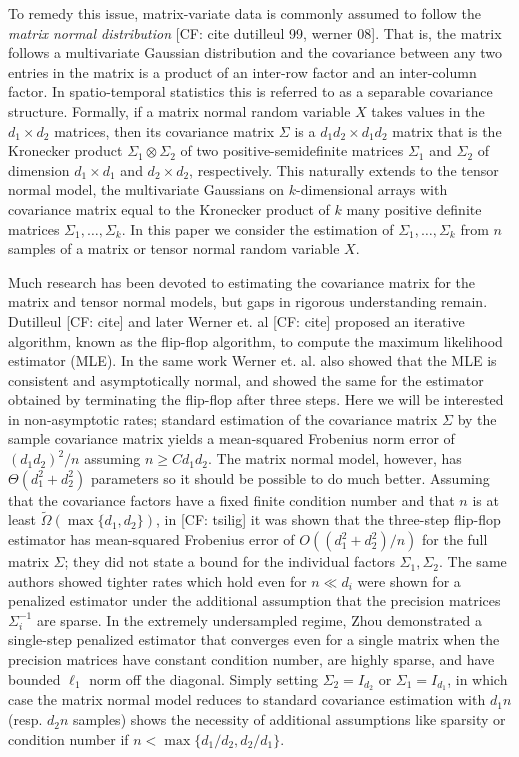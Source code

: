 \documentclass{article}
\newcommand{\ot}{\otimes}
\newcommand{\CF}[1]{{\color{purple}[CF: #1]}}
\begin{document}
To remedy this issue, matrix-variate data is commonly assumed to follow the \emph{matrix normal distribution} \CF{cite dutilleul 99, werner 08}. That is, the matrix follows a multivariate Gaussian distribution and the covariance between any two entries in the matrix is a product of an inter-row factor and an inter-column factor. In spatio-temporal statistics this is referred to as a separable covariance structure. Formally, if a matrix normal random variable $X$ takes values in the $d_1\times d_2$ matrices, then its covariance matrix $\Sigma$ is a $d_1d_2\times d_1 d_2$ matrix that is the Kronecker product $\Sigma_1 \ot \Sigma_2$ of two positive-semidefinite matrices $\Sigma_1$ and $\Sigma_2$ of dimension $d_1\times d_1$ and $d_2\times d_2$, respectively. This naturally extends to the tensor normal model, the multivariate Gaussians on $k$-dimensional arrays with covariance matrix equal to the Kronecker product of $k$ many positive definite matrices $\Sigma_1, \dots, \Sigma_k$. In this paper we consider the estimation of $\Sigma_1, \dots, \Sigma_k$ from $n$ samples of a matrix or tensor normal random variable $X$. 

Much research has been devoted to estimating the covariance matrix for the matrix and tensor normal models, but gaps in rigorous understanding remain. Dutilleul \CF{cite} and later Werner et. al \CF{cite} proposed an iterative algorithm, known as the flip-flop algorithm, to compute the maximum likelihood estimator (MLE). In the same work Werner et. al. also showed that the MLE is consistent and asymptotically normal, and showed the same for the estimator obtained by terminating the flip-flop after three steps. Here we will be interested in non-asymptotic rates; standard estimation of the covariance matrix $\Sigma$ by the sample covariance matrix yields a mean-squared Frobenius norm error of $(d_1 d_2)^2/n$ assuming $n \geq C d_1 d_2$. The matrix normal model, however, has $\Theta(d_1^2 + d_2^2)$ parameters so it should be possible to do much better. Assuming that the covariance factors have a fixed finite condition number and that $n$ is at least $\tilde{\Omega}(\max\{d_1,d_2\})$, in \CF{tsilig} it was shown that the three-step flip-flop estimator has mean-squared Frobenius error of $O((d_1^2 + d_2^2)/n)$ for the full matrix $\Sigma$; they did not state a bound for the individual factors $\Sigma_1,\Sigma_2$. The same authors showed tighter rates which hold even for $n\ll d_i$ were shown for a penalized estimator under the additional assumption that the precision matrices $\Sigma_i^{-1}$ are sparse. In the extremely undersampled regime, Zhou demonstrated a single-step penalized estimator that converges even for a single matrix when the precision matrices have constant condition number, are highly sparse, and have bounded $\ell_1$ norm off the diagonal. Simply setting $\Sigma_2 = I_{d_2}$ or $\Sigma_1 = I_{d_1}$, in which case the matrix normal model reduces to standard covariance estimation with $d_1n$ (resp. $d_2 n$ samples) shows the necessity of additional assumptions like sparsity or condition number if $n < \max\{d_1/d_2, d_2/d_1\}$. 
\end{document}
